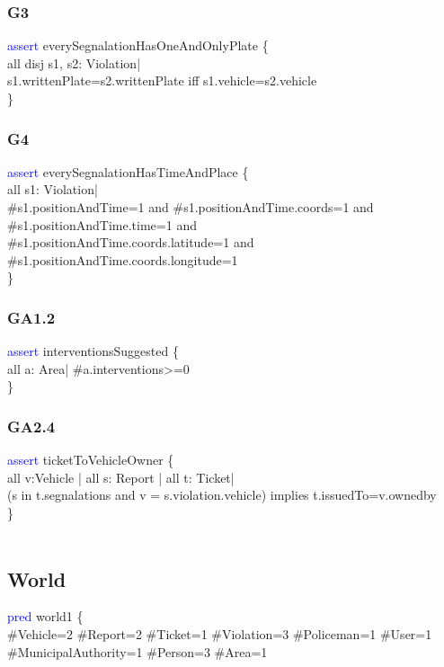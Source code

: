 \subsubsection{G3}
\textcolor{blue}{assert}
\textcolor{mycolor}{everySegnalationHasOneAndOnlyPlate} \{\\
    all disj s1, s2: Violation|\\
s1.writtenPlate=s2.writtenPlate iff s1.vehicle=s2.vehicle\\
\}\\
\subsubsection{G4}
\textcolor{blue}{assert}
\textcolor{mycolor}{everySegnalationHasTimeAndPlace} \{\\
all s1: Violation|\\
\#s1.positionAndTime=1 and \#s1.positionAndTime.coords=1 and \#s1.positionAndTime.time=1 and\\ 
\#s1.positionAndTime.coords.latitude=1 and \#s1.positionAndTime.coords.longitude=1\\
\}\\
\subsubsection{GA1.2}
\textcolor{blue}{assert}
\textcolor{mycolor}{interventionsSuggested} \{\\
all a: Area| \#a.interventions>=0\\
\}\\
\subsubsection{GA2.4}
\textcolor{blue}{assert}
\textcolor{mycolor}{ticketToVehicleOwner} \{\\
all v:Vehicle | all s: Report | all t: Ticket|\\
(s in t.segnalations and v = s.violation.vehicle) implies t.issuedTo=v.ownedby\\
\}\\
\\
\subsection{World}
\textcolor{blue}{pred}
\textcolor{mycolor}{world1} \{\\
\#Vehicle=2
\#Report=2
\#Ticket=1
\#Violation=3
\#Policeman=1
\#User=1
\#MunicipalAuthority=1
\#Person=3
\#Area=1\\

